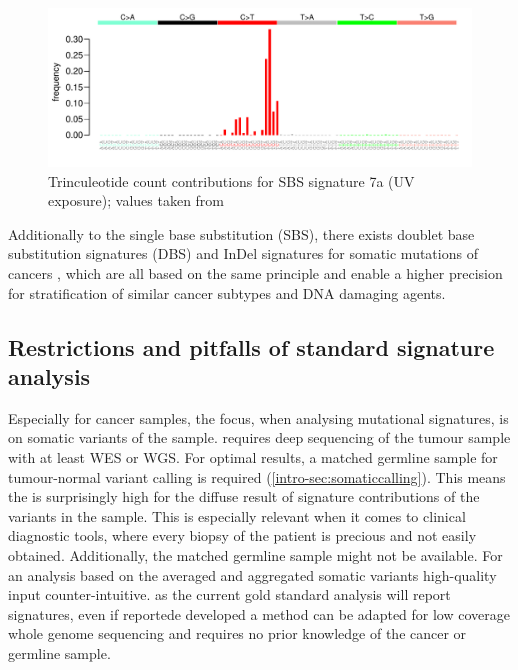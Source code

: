 \begin{figure}[!ht]
\centering
\includegraphics[width=.99\linewidth]{Figures/MisMatchFinder/SBS7aSignature.pdf}
\caption[Trinculeotide count contributions for single base substitution (SBS) signature 7a]{Trinculeotide count contributions for SBS signature 7a (UV exposure); values taken from \protect\textcite{Alexandrov2020}}\label{fig:sig7a}
\end{figure}

Additionally to the single base substitution (SBS), there exists doublet base substitution signatures (DBS) and InDel signatures for somatic mutations of cancers \cite{Alexandrov2020}, which are all based on the same principle and enable a higher precision for stratification of similar cancer subtypes and DNA damaging agents.

\subsection{Restrictions and pitfalls of standard signature analysis}
Especially for cancer samples, the focus, when analysing mutational signatures, is on somatic variants of the sample.  requires deep sequencing of the tumour sample with at least WES or WGS. For optimal results, a  matched germline sample for tumour-normal variant calling is required (\autoref{intro-sec:somaticcalling}). This means the  is surprisingly high for the diffuse result of signature contributions of the variants in the sample. This is especially relevant when it comes to clinical diagnostic tools, where every biopsy of the patient is precious and not easily obtained. Additionally, the matched germline sample might not be available. For an analysis based on the averaged and aggregated somatic variants high-quality input  counter-intuitive.  as the current gold standard analysis will report signatures, even if  reportede developed a method  can be adapted for low coverage whole genome sequencing and requires no prior knowledge of the cancer or  germline sample. 

